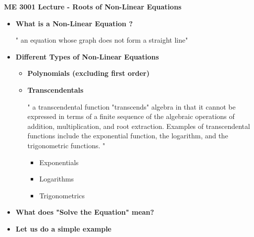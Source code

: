 \documentclass[11pt]{article}
\begin{document}
\textbf{ \LARGE ME 3001 Lecture - Roots of Non-Linear Equations} \\

\begin{itemize}


	\item \textbf{ \LARGE What is a Non-Linear Equation ? }
			
			\Large{" an equation whose graph does not form a straight line"} \\ \vspace{20mm}


	\item \textbf{ \LARGE Different Types of Non-Linear Equations }
		
		\begin{itemize}
			\item \textbf{\Large Polynomials (excluding first order)} \vspace{30mm}
			\item \textbf{\Large Transcendentals} \vspace{10mm}

\Large{" a transcendental function "transcends" algebra in that it cannot be expressed in terms of a finite sequence of the algebraic operations of addition, multiplication, and root extraction. Examples of transcendental functions include the exponential function, the logarithm, and the trigonometric functions. "}\\
				\begin{itemize}
					\item Exponentials \vspace{10mm}
					\item Logarithms \vspace{10mm}
					\item Trigonometrics \vspace{5mm}
				\end{itemize}

		\end{itemize}

	\item \textbf{ \LARGE What does "Solve the Equation" mean?}
	\newpage

	\item \textbf{ \LARGE Let us do a simple example} \\\\
	
		\hspace{20mm}	 \vspace{80mm}
		

\end{itemize}
\end{document}
